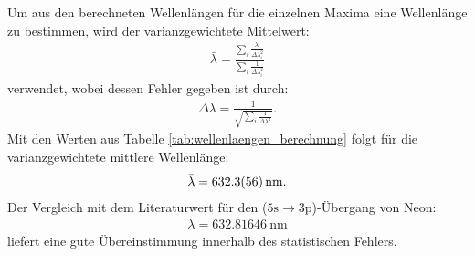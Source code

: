 \documentclass[11pt, a4paper]{article}
\numberwithin{equation}{section}
\begin{document}
Um aus den berechneten Wellenlängen für die einzelnen Maxima eine Wellenlänge zu bestimmen, wird der varianzgewichtete Mittelwert:
\begin{align}
	\bar{\lambda} = \frac{\sum_i \frac{\lambda_i}{\Delta \lambda_i^2}}{\sum_i \frac{1}{\Delta \lambda_i^2}}
\end{align}
verwendet, wobei dessen Fehler gegeben ist durch:
\begin{align}
\Delta \bar{\lambda} = \frac{1}{\sqrt{\sum_i \frac{1}{\Delta \lambda_i^2}}} \text{.}
\end{align}
Mit den Werten aus Tabelle \ref{tab:wellenlaengen_berechnung} folgt für die varianzgewichtete mittlere Wellenlänge:
\begin{align}
	\bar{\lambda} = \SI{632.3 +- 5.6}{\nano\metre} \text{.}
\end{align}
Der Vergleich mit dem Literaturwert \cite{NISTSpectra} für den ($\mathrm{5s} \rightarrow \mathrm{3p}$)-Übergang von Neon:
\begin{align}
	\lambda = \SI{632.81646}{\nano\metre}
	\label{eq:HeNe_wellenlaenge}
\end{align}
liefert eine gute Übereinstimmung innerhalb des statistischen Fehlers.
\end{document}
